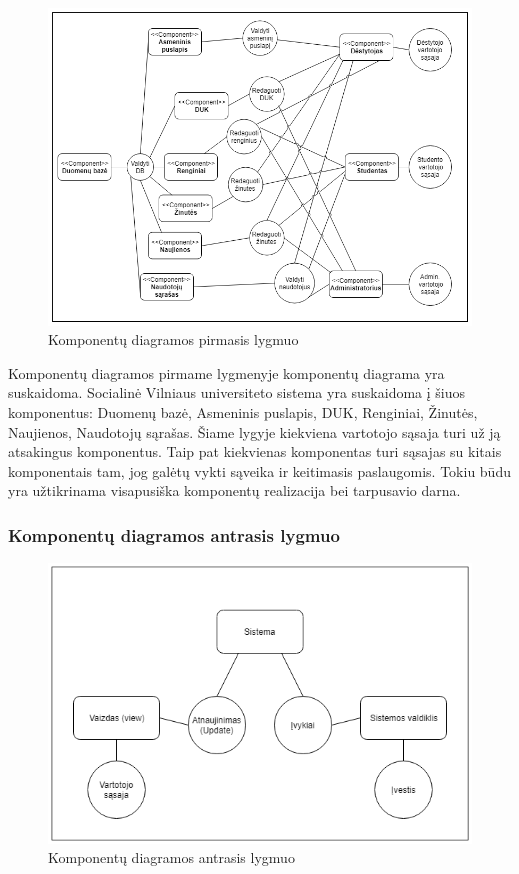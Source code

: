 \documentclass{VUMIFPSkursinis}
\begin{document}
	\begin{figure}[H]
		\centering
		\includegraphics[width=\linewidth]{img/1lygmuo.png}
		\caption{Komponentų diagramos pirmasis lygmuo}
		\label{fig:0lygmuo}
	\end{figure}
	
	Komponentų diagramos pirmame lygmenyje komponentų diagrama yra suskaidoma. Socialinė Vilniaus universiteto sistema yra suskaidoma į šiuos komponentus: Duomenų bazė, Asmeninis puslapis, DUK, Renginiai, Žinutės, Naujienos, Naudotojų sąrašas. Šiame lygyje kiekviena vartotojo sąsaja turi už ją atsakingus komponentus. Taip pat kiekvienas komponentas turi sąsajas su kitais komponentais tam, jog galėtų vykti sąveika ir keitimasis paslaugomis. Tokiu būdu yra užtikrinama visapusiška komponentų realizacija bei tarpusavio darna.
	
	\subsubsection{Komponentų diagramos antrasis lygmuo}
	
	\begin{figure}[H]
		\centering
		\includegraphics[width=\linewidth]{img/2lygmuo.png}
		\caption{Komponentų diagramos antrasis lygmuo}
		\label{fig:0lygmuo}
	\end{figure}
	
\end{document}
